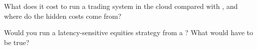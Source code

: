 \begin{interviewq}\label{iq:nw:trading-in-a-public-cloud:5}
What does it cost to run a trading system in the cloud compared with , and where do the hidden costs come from?
\end{interviewq}

\begin{interviewq}\label{iq:nw:trading-in-a-public-cloud:6}
Would you run a latency-sensitive equities strategy from a ? What would have to be true?
\end{interviewq}
